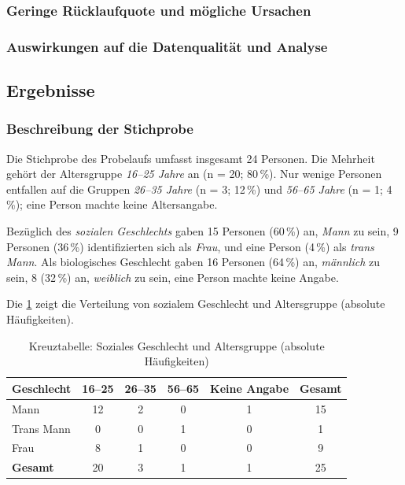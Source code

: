 \subsubsection{Geringe Rücklaufquote und mögliche Ursachen}

\subsubsection{Auswirkungen auf die Datenqualität und Analyse}


\subsection{Ergebnisse} \label{sec:ergebnisse}

\subsubsection*{Beschreibung der Stichprobe}

Die Stichprobe des Probelaufs umfasst insgesamt 24 Personen. Die Mehrheit gehört der Altersgruppe \emph{16–25 Jahre} an (n = 20; 80\,\%). Nur wenige Personen entfallen auf die Gruppen \emph{26–35 Jahre} (n = 3; 12\,\%) und \emph{56–65 Jahre} (n = 1; 4\,\%); eine Person machte keine Altersangabe.

Bezüglich des \emph{sozialen Geschlechts} gaben 15 Personen (60\,\%) an, \emph{Mann} zu sein, 9 Personen (36\,\%) identifizierten sich als \emph{Frau}, und eine Person (4\,\%) als \emph{trans Mann}. Als biologisches Geschlecht gaben 16 Personen (64\,\%) an, \emph{männlich} zu sein, 8 (32\,\%) an, \emph{weiblich} zu sein, eine Person machte keine Angabe.

Die \cref{tab:kreuztabelle_abs} zeigt die Verteilung von sozialem Geschlecht und Altersgruppe (absolute Häufigkeiten).

\begin{table}[H]
    \centering
    \caption{Kreuztabelle: Soziales Geschlecht und Altersgruppe (absolute Häufigkeiten)}
    \label{tab:kreuztabelle_abs}
    \begin{tabular}{lccccc}
    \toprule
    \textbf{Geschlecht} & 16--25 & 26--35 & 56--65 & Keine Angabe & Gesamt \\
    \midrule
    Mann       & 12 & 2 & 0 & 1 & 15 \\
    Trans Mann &  0 & 0 & 1 & 0 & 1  \\
    Frau       &  8 & 1 & 0 & 0 & 9  \\
    \midrule
    \textbf{Gesamt} & 20 & 3 & 1 & 1 & 25 \\
    \bottomrule
    \end{tabular}
\end{table}

